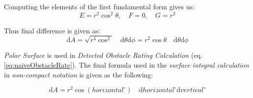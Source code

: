 \noindent Computing the elements of the first fundamental form gives us:
\begin{equation}
    E = r^2\cos^2\theta,\quad F=0,\quad G=r^2
\end{equation}

\noindent Thus final difference is given as:
\begin{equation}\label{eq:finalCellSquareNice}
    \text{d}A=\sqrt{r^4\cos^2}\quad \text{d}\theta\text{d}\phi = r^2 \cos\theta\quad \text{d}\theta\text{d}\phi
\end{equation}

\begin{note} 
    \emph{Polar Surface} is used in \emph{Detected Obstacle Rating Calculation} (eq. \ref{eq:naiveObstacleRate}). The final formula used in the \emph{surface integral calculation} in \emph{non-compact notation} is given as the following:

    \begin{equation}\label{eq:finalCellSquare}
        \text{d}A= r^2 \cos(horizontal^\circ)\quad \text{d}horizontal^\circ \text{d}vertical^\circ
    \end{equation}
\end{note}